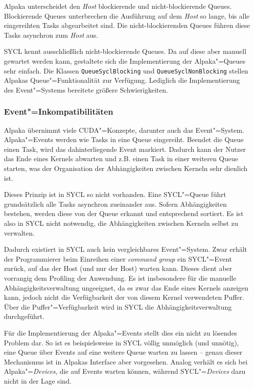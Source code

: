 Alpaka unterscheidet den \textit{Host} blockierende und nicht-blockierende
Queues. Blockierende Queues unterbrechen die Ausführung auf dem \textit{Host} so
lange, bis alle eingereihten Tasks abgearbeitet sind. Die nicht-blockierenden
Queues führen diese Tasks asynchron zum \textit{Host} aus.

SYCL kennt ausschließlich nicht-blockierende Queues. Da auf diese aber manuell
gewartet werden kann, gestaltete sich die Implementierung der Alpaka"=Queues
sehr einfach. Die Klassen \texttt{QueueSyclBlocking} und
\texttt{QueueSyclNonBlocking} stellen Alpakas Queue"=Funktionalität zur
Verfügung. Lediglich die Implementierung des Event"=Systems bereitete größere
Schwierigkeiten.

\subsubsection{Event"=Inkompatibilitäten}

Alpaka übernimmt viele CUDA"=Konzepte, darunter auch das Event"=System.
Alpaka"=Events werden wie Tasks in eine Queue eingereiht. Beendet die Queue
einen Task, wird das dahinterliegende Event markiert. Dadurch kann der Nutzer
das Ende eines Kernels abwarten und z.B. einen Task in einer weiteren Queue
starten, was der Organisation der Abhängigkeiten zwischen Kerneln sehr dienlich
ist.

Dieses Prinzip ist in SYCL so nicht vorhanden. Eine SYCL"=Queue führt
grundsätzlich alle Tasks asynchron zueinander aus. Sofern Abhängigkeiten
bestehen, werden diese von der Queue erkannt und entsprechend sortiert. Es ist
also in SYCL nicht notwendig, die Abhängigkeiten zwischen Kerneln selbst zu
verwalten.

Dadurch existiert in SYCL auch kein vergleichbares Event"=System. Zwar erhält
der Programmierer beim Einreihen einer \textit{command group} ein SYCL"=Event
zurück, auf das der Host (und nur der Host) warten kann. Dieses dient aber
vorrangig dem Profiling der Anwendung. Es ist insbesondere für die manuelle
Abhängigkeitsverwaltung ungeeignet, da es zwar das Ende eines Kernels anzeigen
kann, jedoch nicht die Verfügbarkeit der von diesem Kernel verwendeten Puffer.
Über die Puffer"=Verfügbarkeit wird in SYCL die Abhängigkeitsverwaltung
durchgeführt.

Für die Implementierung der Alpaka"=Events stellt dies ein nicht zu lösendes
Problem dar. So ist es beispielsweise in SYCL völlig unmöglich (und unnötig),
eine Queue über Events auf eine weitere Queue warten zu lassen -- genau dieser
Mechanismus ist in Alpakas Interface aber vorgesehen. Analog verhält es sich bei
Alpaka"=\textit{Devices}, die auf Events warten können, während
SYCL"=\textit{Devices} dazu nicht in der Lage sind.

